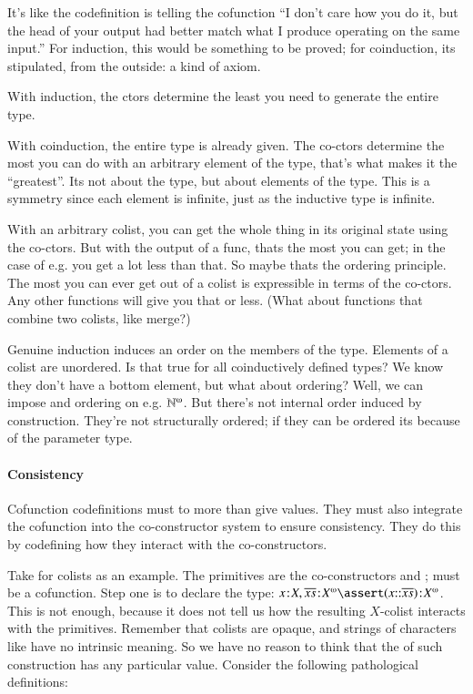 It's like the codefinition is telling the cofunction ``I don't care
how you do it, but the head of your output had better match what I
produce operating on the same input.'' For induction, this would be
something to be proved; for coinduction, its stipulated, from the
outside: a kind of axiom.

With induction, the ctors determine the least you need to generate the
entire type.

With coinduction, the entire type is already given. The co-ctors
determine the most you can do with an arbitrary element of the type,
that's what makes it the ``greatest''. Its not about the type, but
about elements of the type. This is a symmetry since each element is
infinite, just as the inductive type is infinite.

With an arbitrary colist, you can get the whole thing in its original
state using the co-ctors. But with the output of a func, thats the
most you can get; in the case of e.g.  you get a lot less
than that. So maybe thats the ordering principle. The most you can
ever get out of a colist is expressible in terms of the co-ctors. Any
other functions will give you that or less. (What about functions that
combine two colists, like merge?)

Genuine induction induces an order on the members of the type.
Elements of a colist are unordered. Is that true for all coinductively
defined types? We know they don't have a bottom element, but what
about ordering? Well, we can impose and ordering on e.g.
\(\colist{\Nat}\). But there's not internal order induced by
construction. They're not structurally ordered; if they can be ordered
its because of the parameter type.

\paragraph{Consistency}

Cofunction codefinitions must to more than give values. They must also
integrate the cofunction into the co-constructor system to ensure
consistency. They do this by codefining how they interact with the
co-constructors.

Take \Cons{} for colists as an example. The primitives are the
co-constructors \head{} and \tail{}; \cons{} must be a cofunction.
Step one is to declare the type: \(\tj{x}{X},
\tj{\coseq{x}}{\colist{X}}\lso \tj{(x\cons\coseq{x})}{\colist{X}}\).
This is not enough, because it does not tell us how the resulting
\(X\)-colist interacts with the primitives. Remember that colists are
opaque, and strings of characters like \cons have no intrinsic
meaning. So we have no reason to think that the \head of such
construction has any particular value. Consider the following
pathological definitions:

